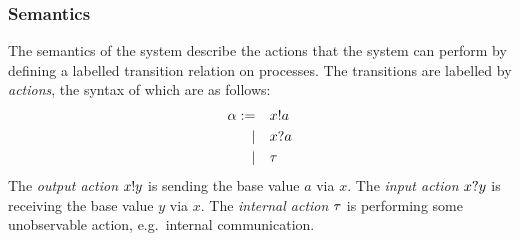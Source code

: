 



\subsubsection{Semantics}
The semantics of the system describe the actions that the system can perform by defining a labelled transition relation on processes.
The transitions are labelled by \emph{actions}, the syntax of which are as follows:
\begin{align*}
  \alpha := &&& x ! a \\
  |&&& x ? a \\
  |&&& \tau
\end{align*}
The \emph{output action} \( x ! y \) is sending the base value \( a \) via \( x \).
The \emph{input action} \( x ? y \) is receiving the base value \( y \) via \( x \).
The \emph{internal action} \( \tau \) is performing some unobservable action, e.g.\ internal communication.

